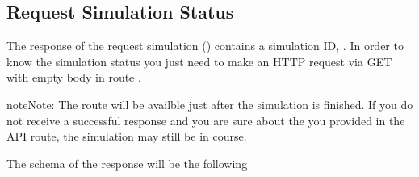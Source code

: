 \documentclass[a4paper,landscape,10pt,english]{sphinxmanual}
\begin{document}
\subsection{Request Simulation Status}
\label{\detokenize{start/overview:request-simulation-status}}
The response of the request simulation ({\hyperref[\detokenize{start/overview:simidresponse}]{}})
contains a simulation ID, . In order to know the simulation status you
just need to make an HTTP request via GET with empty body in route
.

\begin{sphinxadmonition}{note}{Note:}
The route will be availble just after the simulation is finished. If you do
not receive a successful response and you are sure about the  you
provided in the API route, the simulation may still be in course.
\end{sphinxadmonition}

The schema of the response will be the following


\subsubsection{}
\label{\detokenize{start/overview:simstatus}}\label{\detokenize{start/overview:id2}}
\end{document}
